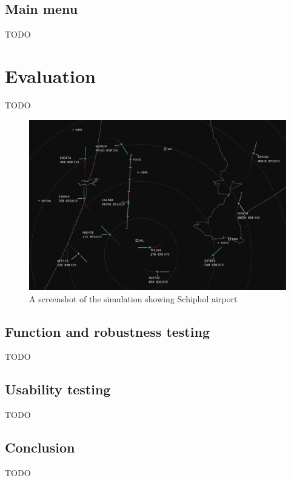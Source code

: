 \documentclass{article}
\begin{document}
\subsection{Main menu}
TODO


\section{Evaluation}
TODO
\begin{figure}[H]
\centering
\includegraphics[width=\textwidth]{screenshots/schiphol2.png}
\caption{\label{fig:schiphol}A screenshot of the simulation showing Schiphol airport}
\end{figure}


\subsection{Function and robustness testing}
TODO


\subsection{Usability testing}
TODO


\subsection{Conclusion}
TODO



\clearpage

\printbibliography
{}

\printglossaries
\end{document}
